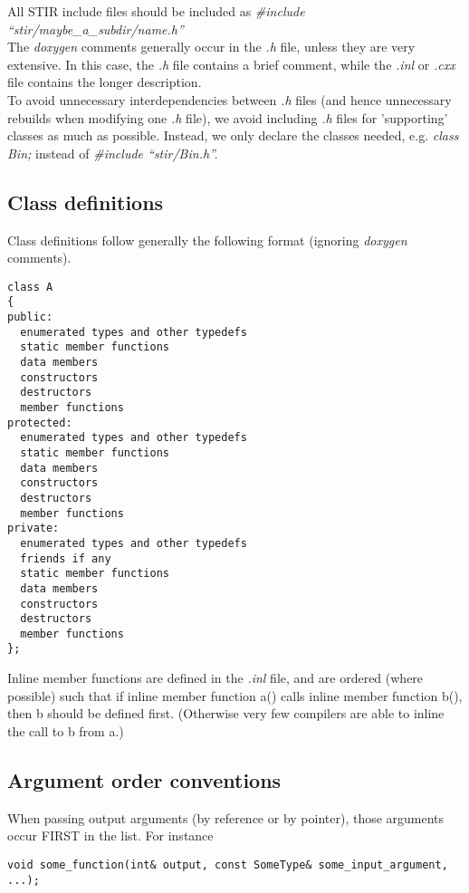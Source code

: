 \documentclass{article}
\begin{document}
All STIR include files should be included as \textit{\#include ``stir/maybe\_a\_subdir/name.h''}\\
The \textit{doxygen} comments generally occur in the \textit{.h} file, unless 
they are very extensive. In this case, the \textit{.h} file contains 
a brief comment, while the \textit{.inl} or \textit{.cxx} file contains 
the longer description.\\
To avoid unnecessary interdependencies between \textit{.h} files (and 
hence unnecessary rebuilds when modifying one \textit{.h} file), we 
avoid including \textit{.h} files for 'supporting' classes as much 
as possible. Instead, we only declare the classes needed, e.g. \textit{class 
Bin;} instead of \textit{\#include ``stir/Bin.h''.}



\subsection{
Class definitions}

Class definitions follow generally the following format (ignoring \textit{doxygen} 
comments).

\begin{verbatim}
class A
{
public: 
  enumerated types and other typedefs 
  static member functions  
  data members  
  constructors 
  destructors 
  member functions
protected: 
  enumerated types and other typedefs 
  static member functions 
  data members 
  constructors 
  destructors 
  member functions
private: 
  enumerated types and other typedefs 
  friends if any 
  static member functions 
  data members 
  constructors 
  destructors 
  member functions
};
\end{verbatim}


Inline member functions are defined in the \textit{.inl} file, and 
are ordered (where possible) such that if inline member function 
a() calls inline member function b(), 
then b should be defined first. (Otherwise very 
few compilers are able to inline the call to b 
from a.)



\subsection{
Argument order conventions}

When passing output arguments (by reference or by pointer), those 
arguments occur FIRST in the list. For instance
\begin{verbatim}
void some_function(int& output, const SomeType& some_input_argument, ...);
\end{verbatim}
\end{document}
